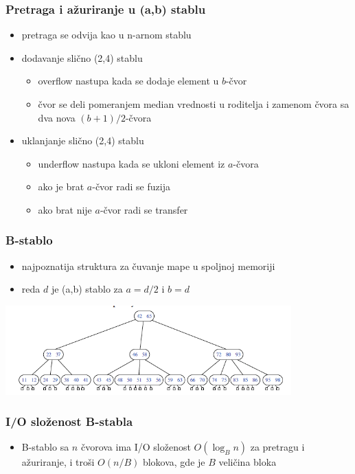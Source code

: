 \documentclass[compress,aspectratio=169]{beamer}
\begin{document}
\begin{frame}[fragile]
  \frametitle{Pretraga i ažuriranje u (a,b) stablu}
  \begin{itemize}
    \item pretraga se odvija kao u n-arnom stablu
    \item dodavanje slično (2,4) stablu
    \begin{itemize}
      \item overflow nastupa kada se dodaje element u $b$-čvor
      \item čvor se deli pomeranjem median vrednosti u roditelja i zamenom čvora sa
      dva nova $(b+1)/2$-čvora
    \end{itemize}
    \item uklanjanje slično (2,4) stablu
    \begin{itemize}
      \item underflow nastupa kada se ukloni element iz $a$-čvora
      \item ako je brat $a$-čvor radi se fuzija
      \item ako brat nije $a$-čvor radi se transfer
    \end{itemize}
  \end{itemize}
\end{frame}

\begin{frame}[fragile]
  \frametitle{B-stablo}
  \begin{itemize}
    \item najpoznatija struktura za čuvanje mape u spoljnoj memoriji
    \item {} reda $d$ je (a,b) stablo za $a=d/2$ i $b=d$
  \end{itemize}
  \begin{center}
    \includegraphics[width=11cm]{asp-15-pic07.png}
  \end{center}
\end{frame}

\begin{frame}[fragile]
  \frametitle{I/O složenost B-stabla}
  \begin{itemize}
    \item B-stablo sa $n$ čvorova ima I/O složenost $O(\log_{B}n)$ za pretragu
    i ažuriranje, i troši $O(n/B)$ blokova, gde je $B$ veličina bloka
  \end{itemize}
\end{frame}
\end{document}
